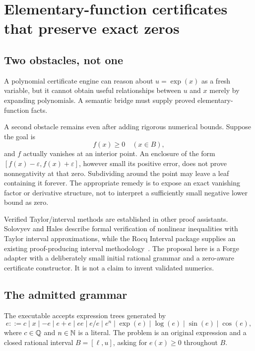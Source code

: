 \section{Elementary-function certificates that preserve exact zeros}
\label{sec:analytic}

\subsection{Two obstacles, not one}
A polynomial certificate engine can reason about \(u=\exp(x)\) as a fresh variable, but it cannot obtain useful relationships between \(u\) and \(x\) merely by expanding polynomials. A semantic bridge must supply proved elementary-function facts.

A second obstacle remains even after adding rigorous numerical bounds. Suppose the goal is
\[
 f(x)\ge0\quad(x\in B),
\]
and \(f\) actually vanishes at an interior point. An enclosure of the form \([f(x)-\varepsilon,f(x)+\varepsilon]\), however small its positive error, does not prove nonnegativity at that zero. Subdividing around the point may leave a leaf containing it forever. The appropriate remedy is to expose an exact vanishing factor or derivative structure, not to interpret a sufficiently small negative lower bound as zero.

Verified Taylor/interval methods are established in other proof assistants. Solovyev and Hales describe formal verification of nonlinear inequalities with Taylor interval approximations, while the Rocq Interval package supplies an existing proof-producing interval methodology~\cite{solovyev-hales,rocq-interval}. The proposal here is a Forge adapter with a deliberately small initial rational grammar and a zero-aware certificate constructor. It is not a claim to invent validated numerics.

\subsection{The admitted grammar}
The executable accepts expression trees generated by
\[
 e::=c\mid x\mid -e\mid e+e\mid ee\mid e/e\mid e^n
       \mid\exp(e)\mid\log(e)\mid\sin(e)\mid\cos(e),
\]
where \(c\in\mathbb{Q}\) and \(n\in\mathbb{N}\) is a literal. The problem is an original expression and a closed rational interval \(B=[\ell,u]\), asking for \(e(x)\ge0\) throughout \(B\).

